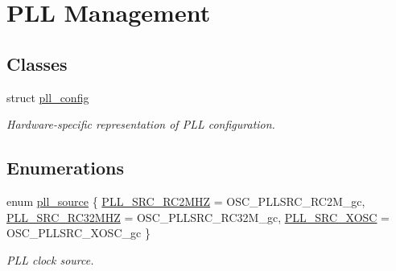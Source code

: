 \hypertarget{group__pll__group}{\section{P\-L\-L Management}
\label{group__pll__group}
}
\subsection*{Classes}
\begin{DoxyCompactItemize}
\item 
struct \hyperlink{structpll__config}{pll\-\_\-config}
\begin{DoxyCompactList}\small\item\em Hardware-\/specific representation of P\-L\-L configuration. \end{DoxyCompactList}\end{DoxyCompactItemize}
\subsection*{Enumerations}
\begin{DoxyCompactItemize}
\item 
enum \hyperlink{group__pll__group_gacfb06d8fc0ffbe934077438884ae697f}{pll\-\_\-source} \{ \hyperlink{group__pll__group_ggacfb06d8fc0ffbe934077438884ae697fa8d6c5d7cba070c0062c7495fb7dd820e}{P\-L\-L\-\_\-\-S\-R\-C\-\_\-\-R\-C2\-M\-H\-Z} =  O\-S\-C\-\_\-\-P\-L\-L\-S\-R\-C\-\_\-\-R\-C2\-M\-\_\-gc, 
\hyperlink{group__pll__group_ggacfb06d8fc0ffbe934077438884ae697fae1691a76378e7695a0fbe0ad799d9f2f}{P\-L\-L\-\_\-\-S\-R\-C\-\_\-\-R\-C32\-M\-H\-Z} =  O\-S\-C\-\_\-\-P\-L\-L\-S\-R\-C\-\_\-\-R\-C32\-M\-\_\-gc, 
\hyperlink{group__pll__group_ggacfb06d8fc0ffbe934077438884ae697faa1f35e8d0a200dc3ba94d97a13bf5bfa}{P\-L\-L\-\_\-\-S\-R\-C\-\_\-\-X\-O\-S\-C} =  O\-S\-C\-\_\-\-P\-L\-L\-S\-R\-C\-\_\-\-X\-O\-S\-C\-\_\-gc
 \}
\begin{DoxyCompactList}\small\item\em P\-L\-L clock source. \end{DoxyCompactList}\end{DoxyCompactItemize}
